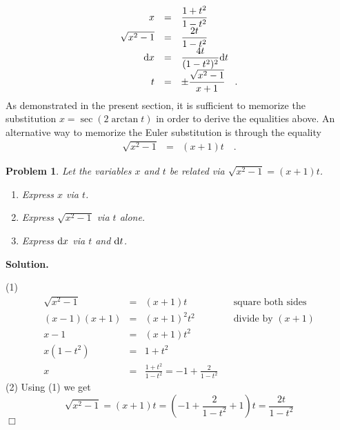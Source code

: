 \documentclass[12pt]{book}
\newenvironment{solution}{\medskip\noindent\textbf{Solution.} }{$\Box$}
\newtheorem{problem}[theorem]{Problem}
\begin{document}
\[
\begin{array}{rcl}
x&=&\displaystyle \frac{1+t^2}{1-t^2}\\
\sqrt{x^2-1}&=&\displaystyle \frac{2t}{1-t^2}  \\
{\normalfont \text{d}} x&=&\displaystyle  \frac{4 t}{(1- t^{2})^{2}} {\normalfont \text{d}} t\\
t&=&\displaystyle \pm \frac{ \sqrt{x^2-1}}{x+1} \quad .
\end{array}
\]
As demonstrated in the present section, it is sufficient to memorize the substitution $x=\sec (2\arctan t)$ in order to derive the equalities above. An alternative way to memorize the Euler substitution is through the equality
\[
\begin{array}{rcl}
\sqrt{x^2-1}&=&(x+1)t\quad .
\end{array}
\]
\begin{problem}
Let the variables $x$ and $t$ be related via $\sqrt{x^2-1}=(x+1)t$.
\begin{enumerate}
\item Express $x$ via $t$.
\item Express $\sqrt{x^2-1}$ via $t$ alone.
\item Express ${\normalfont \text{d}} x$ via $t$ and ${\normalfont \text{d}} t$.
\end{enumerate}
\end{problem}
\begin{solution}

\noindent(1)
\[
\begin{array}{rcll|l}
\displaystyle \sqrt{x^2-1}&=&\displaystyle (x+1)t&&\text{square both sides}\\
\displaystyle (x-1)(x+1)&=&\displaystyle (x+1)^2t^2&&\text{divide by } (x+1)\\
\displaystyle x-1&=&\displaystyle (x+1)t^2\\
\displaystyle x(1-t^2)&=&\displaystyle 1+t^2\\
\displaystyle x&=& \displaystyle \frac{1+t^2}{1-t^2}= -1+\frac{2}{1-t^2}
\end{array}
\]
(2) Using (1) we get
\[
\sqrt{x^2-1}=(x+1)t=\left(-1+\frac{2}{1-t^2}+1\right)t=\frac{2t}{1-t^2}
\]
\end{solution}
\end{document}
